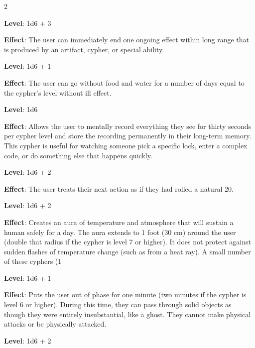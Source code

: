 \begin{multicols}{2}


\textbf{Level}: 1d6 + 3

\textbf{Effect}: The user can immediately end one ongoing effect within long range that is produced by an artifact, cypher, or special ability.


\textbf{Level}: 1d6 + 1

\textbf{Effect}: The user can go without food and water for a number of days equal to the cypher’s level without ill effect.


\textbf{Level}: 1d6

\textbf{Effect}: Allows the user to mentally record everything they see for thirty seconds per cypher level and store the recording permanently in their long-term memory. This cypher is useful for watching someone pick a specific lock, enter a complex code, or do something else that happens quickly.


\textbf{Level}: 1d6 + 2

\textbf{Effect}: The user treats their next action as if they had rolled a natural 20.


\textbf{Level}: 1d6 + 2

\textbf{Effect}: Creates an aura of temperature and atmosphere that will sustain a human safely for a day. The aura extends to 1 foot (30 cm) around the user (double that radius if the cypher is level 7 or higher). It does not protect against sudden flashes of temperature change (such as from a heat ray). A small number of these cyphers (1%


\textbf{Level}: 1d6 + 1

\textbf{Effect}: Puts the user out of phase for one minute (two minutes if the cypher is level 6 or higher). During this time, they can pass through solid objects as though they were entirely insubstantial, like a ghost. They cannot make physical attacks or be physically attacked.


\textbf{Level}: 1d6 + 2


\end{multicols}
